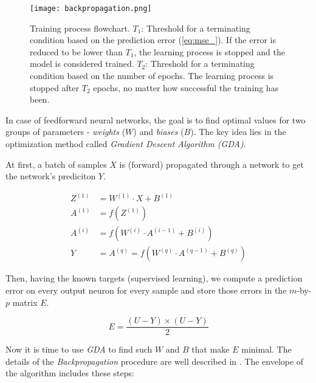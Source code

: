 \begin{figure}[H]
  \centering
  \texttt{[image: backpropagation.png]}
  \caption{Training process flowchart. $ T_1 $: Threshold for a terminating condition based on the prediction error (\cref{eq:mse_}). If the error is reduced to be lower than $ T_1 $, the learning process is stopped and the model is considered trained. $ T_2 $: Threshold for a terminating condition based on the number of epochs. The learning process is stopped after $ T_2 $ epochs, no matter how successful the training has been.}
  \label{fig:methods:backpropagation}
\end{figure}

In case of feedforward neural networks, the goal is to find optimal values for two groups of parameters - \textit{weights} ($ W $) and \textit{biases} ($ B $). The key idea lies in the optimization method called \textit{Gradient Descent Algorithm (GDA)}.

At first, a batch of samples $ X $ is (forward) propagated through a network to get the network's prediciton $ Y $.

\begin{align}
Z^{(1)} &= W^{(1)} \cdot X + B^{(1)} \\
A^{(1)} &= f(Z^{(1)}) \\
A^{(i)} &= f(W^{(i)} \cdot A^{(i-1)} + B^{(i)}) \\
Y &= A^{(q)} = f(W^{(q)} \cdot A^{(q-1)} + B^{(q)})
\end{align}

Then, having the known targets (supervised learning), we compute a prediction error on every output neuron for every sample and store those errors in the $ m $-by-$ p $ matrix $ E $.

\begin{equation} \label{eq:prediction_error}
E = \frac{(U - Y) \times (U - Y)}{2}
\end{equation}

Now it is time to use \textit{GDA} to find such $ W $ and $ B $ that make $ E $ minimal. The details of the \textit{Backpropagation} procedure are well described in \citep{online:nnanddl}. The envelope of the algorithm includes these steps:

